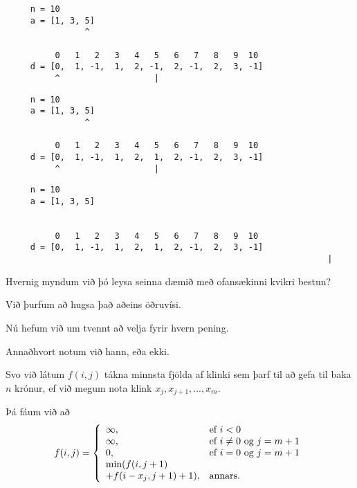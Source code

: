 \begin{frame}[fragile]
\begin{verbatim}
     n = 10
     a = [1, 3, 5]
                ^

          0   1   2   3   4   5   6   7   8   9  10
     d = [0,  1, -1,  1,  2, -1,  2, -1,  2,  3, -1]
          ^                   |
\end{verbatim}
\end{frame}
\addtocounter{framenumber}{-1}

\begin{frame}[fragile]
\begin{verbatim}
     n = 10
     a = [1, 3, 5]
                ^

          0   1   2   3   4   5   6   7   8   9  10
     d = [0,  1, -1,  1,  2,  1,  2, -1,  2,  3, -1]
          ^                   |
\end{verbatim}
\end{frame}
\addtocounter{framenumber}{-1}

\begin{frame}[fragile]
\begin{verbatim}
     n = 10
     a = [1, 3, 5]
                 

          0   1   2   3   4   5   6   7   8   9  10
     d = [0,  1, -1,  1,  2,  1,  2, -1,  2,  3, -1]
                                                                 |
\end{verbatim}
\end{frame}

{
	{
		\item<1-> Hvernig myndum við þó leysa seinna dæmið með ofansækinni kvikri bestun?
		\item<2-> Við þurfum að hugsa það aðeins öðruvísi.
		\item<3-> Nú hefum við um tvennt að velja fyrir hvern pening.
		\item<4-> Annaðhvort notum við hann, eða ekki.
		\item<5-> Svo við látum $f(i, j)$ tákna minnsta fjölda af klinki sem þarf til að gefa til baka $n$ krónur,
					ef við megum nota klink $x_j, x_{j + 1}, ..., x_m$.
		\item<6-> Þá fáum við að
		\[
			f(i, j) = \left \{
			\env{array}
			{
				{l l}
				\infty, & \text{ef $i < 0$}\\
				\infty, & \text{ef $i \neq 0$ og $j = m + 1$}\\
				0, & \text{ef $i = 0$ og $j = m + 1$}\\
				\text{min}(f(i, j + 1) &\\
				+ f(i - x_j, j + 1) + 1), & \text{annars.}\\
			}
			\right .
		\]
	}
}

